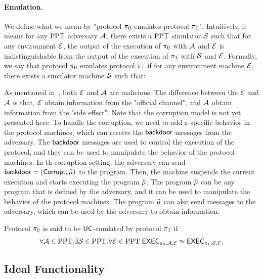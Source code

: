 \paragraph{Emulation.} We define what we mean by "protocol $\mathsf{\pi}_0$ emulates protocol $\mathsf{\pi}_1$". Intuitively, it means for any ${\text{PPT}}$ adversary $\mathcal{A}$, there exists a ${\text{PPT}}$ simulator $\mathcal{S}$ such that for any environment $\mathcal{E}$, the output of the execution of $\mathsf{\pi}_0$ with $\mathcal{A}$ and $\mathcal{E}$ is indistinguishable from the output of the execution of $\mathsf{\pi}_1$ with $\mathcal{S}$ and $\mathcal{E}$. Formally, we say that protocol $\mathsf{\pi}_0$ emulates protocol $\mathsf{\pi}_1$ if for any environment machine $\mathcal{E}$, there exists a simulator machine $\mathcal{S}$ such that:

As mentioned in~\cite{JACM:Canetti20}, both $\mathcal{E}$ and $\mathcal{A}$ are malicious. The difference between the $\mathcal{E}$ and $\mathcal{A}$ is that, $\mathcal{E}$ obtain information from the "official channel", and $\mathcal{A}$ obtain information from the "side effect". Note that the corruption model is not yet presented here. To handle the corruption, we need to add a specific behavior in the protocol machines, which can receive the $\mathsf{backdoor}$ messages from the adversary. The $\mathsf{backdoor}$ messages are used to control the execution of the protocol, and they can be used to manipulate the behavior of the protocol machines. In th corruption setting, the adversary can send $\mathsf{backdoor} = (\mathsf{Corrupt}, \mathsf{\tilde{\mu}})$ to the program. Then, the machine suspends the current execution and starts executing the program $\mathsf{\tilde{\mu}}$. The program $\mathsf{\tilde{\mu}}$ can be any program that is defined by the adversary, and it can be used to manipulate the behavior of the protocol machines. The program $\mathsf{\tilde{\mu}}$ can also send messages to the adversary, which can be used by the adversary to obtain information.
\begin{definition}
    Protocol $\mathsf{\pi}_0$ is said to be $\mathsf{UC}$-emulated by protocol $\mathsf{\pi}_1$ if
    \begin{gather*}
        \forall \mathcal{A} \in {\text{PPT}}. \exists \mathcal{S} \in {\text{PPT}}. \forall \mathcal{E} \in {\text{PPT}}. \mathsf{EXEC}_{\mathsf{\pi}_0, \mathcal{A}, \mathcal{E}} \approx \mathsf{EXEC}_{\mathsf{\pi}_1, \mathcal{S}, \mathcal{E}}. 
    \end{gather*}
\end{definition}

\subsection{Ideal Functionality}

